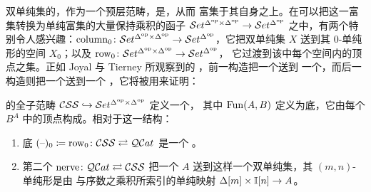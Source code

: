 双单纯集的\trCategory，作为一个预层范畴，是\trCartesianClosed，从而
富集于其自身之上。在可以把这一富集转换为单纯富集的大量保持乘积的函子
$\mathcal{S}et^{\Delta^{\mathrm{op}}\times\Delta^{\mathrm{op}}}\to\mathcal{S}et^{\Delta^{\mathrm{op}}}$
之中，有两个特别令人感兴趣：$\mathrm{column}_{0}\colon\mathcal{S}et^{\Delta^{\mathrm{op}}\times\Delta^{\mathrm{op}}}\to\mathcal{S}et^{\Delta^{\mathrm{op}}}$，它把双单纯集 $X$
送到其 $0$-单纯形的空间 $X_{0}$；以及 $\mathrm{row}_{0}\colon\mathcal{S}et^{\Delta^{\mathrm{op}}\times\Delta^{\mathrm{op}}}\to\mathcal{S}et^{\Delta^{\mathrm{op}}}$，
它过渡到该\trSimplicialObject{}中每个空间内的顶点之集。正如 Joyal 与
Tierney 所观察到的 \cite{bib64}，前一构造把一个\trCompleteSegalSpaces{}送到
一个\trKanComplex，而后一构造则把一个\trCompleteSegalSpaces{}送到一个%
\trQuasiCategory，它将被用来证明：

\begin{proposition}\label{prop:css-cosmos}
\trCompleteSegalSpaces{}的全子范畴 $\mathcal{C}\mathcal{S}\mathcal{S}\hookrightarrow\mathcal{S}et^{\Delta^{\mathrm{op}}\times\Delta^{\mathrm{op}}}$ 定义一个\trCartesianClosed{}\trInfinityCosmos，
其中\trFunctorSpace{} $\operatorname{Fun}(A,B)$ 定义为底\trQuasiCategory，它由每个%
\trInternalHom{} $B^{A}$ 中的顶点构成。相对于这一\trInfinityCosmos{}结构：
\begin{enumerate}[label=(\roman*)]
\item 底\trQuasiCategory{}\trFunctor{} $(\text{--})_{0}\coloneqq\mathrm{row}_{0}\colon\mathcal{C}\mathcal{S}\mathcal{S}\rightleftarrows\mathcal{Q}\mathcal{C}at$ 是一个%
  \trCosmologicalBiequivalence。
\item 第二个\trCosmologicalBiequivalence{} $\mathrm{nerve}\colon\mathcal{Q}\mathcal{C}at\rightleftarrows\mathcal{C}\mathcal{S}\mathcal{S}$
  把一个\trQuasiCategory{} $A$ 送到这样一个双单纯集，其 $(m,n)$-单纯形是由%
  \trOrdinalCategory{}与序数\trGroupoid{}之乘积所索引的单纯映射
  $\Delta[m]\times\mathbb{I}[n]\to A$。
\end{enumerate}
\end{proposition}
